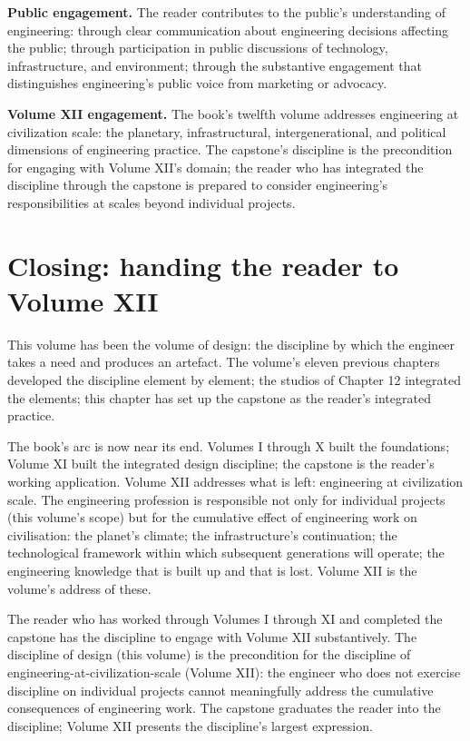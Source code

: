 \textbf{Public engagement.} The reader contributes to the public's understanding of engineering: through clear communication about engineering decisions affecting the public; through participation in public discussions of technology, infrastructure, and environment; through the substantive engagement that distinguishes engineering's public voice from marketing or advocacy.

\textbf{Volume XII engagement.} The book's twelfth volume addresses engineering at civilization scale: the planetary, infrastructural, intergenerational, and political dimensions of engineering practice. The capstone's discipline is the precondition for engaging with Volume XII's domain; the reader who has integrated the discipline through the capstone is prepared to consider engineering's responsibilities at scales beyond individual projects.

\section{Closing: handing the reader to Volume XII}

This volume has been the volume of design: the discipline by which the engineer takes a need and produces an artefact. The volume's eleven previous chapters developed the discipline element by element; the studios of Chapter 12 integrated the elements; this chapter has set up the capstone as the reader's integrated practice.

The book's arc is now near its end. Volumes I through X built the foundations; Volume XI built the integrated design discipline; the capstone is the reader's working application. Volume XII addresses what is left: engineering at civilization scale. The engineering profession is responsible not only for individual projects (this volume's scope) but for the cumulative effect of engineering work on civilisation: the planet's climate; the infrastructure's continuation; the technological framework within which subsequent generations will operate; the engineering knowledge that is built up and that is lost. Volume XII is the volume's address of these.

The reader who has worked through Volumes I through XI and completed the capstone has the discipline to engage with Volume XII substantively. The discipline of design (this volume) is the precondition for the discipline of engineering-at-civilization-scale (Volume XII): the engineer who does not exercise discipline on individual projects cannot meaningfully address the cumulative consequences of engineering work. The capstone graduates the reader into the discipline; Volume XII presents the discipline's largest expression.

